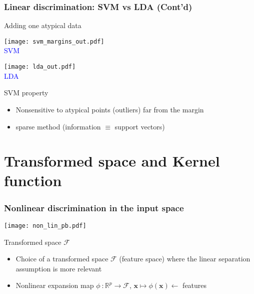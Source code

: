 \documentclass[compress, smaller, serif, 9pt]{beamer}
\newcommand{\structuretext}[1]{{\usebeamercolor[fg]{structure} #1}}
\newcommand{\doigt}{\structuretext{\noindent \Pisymbol{pzd}{43}}}
\newcommand{\bx}{{\boldsymbol{x}}}
\begin{document}
\begin{frame}
  \frametitle{Linear discrimination:  SVM vs LDA (Cont'd)}

\begin{block}{Adding one atypical data}
\end{block}


\begin{minipage}{.48\textwidth}
\begin{center}
\texttt{[image: svm\_margins\_out.pdf]}\\
\textcolor{blue}{SVM}
\end{center}
\end{minipage}
\hfill
\begin{minipage}{.48\textwidth}
\begin{center}
\texttt{[image: lda\_out.pdf]}\\
\textcolor{blue}{LDA}
\end{center}
\end{minipage}

  \begin{block}{SVM property}
   \begin{itemize}
    \item Nonsensitive to atypical points (outliers) far from the margin
    \item[\doigt] sparse method (information $\equiv$ support vectors)
   \end{itemize}
  \end{block}

\end{frame}




\section{Transformed space and Kernel function}




\begin{frame}
  \frametitle{Nonlinear discrimination in the input space}


\begin{center}
\texttt{[image: non\_lin\_pb.pdf]}
\end{center}

\begin{block}{Transformed space $\mathcal{F}$}
\begin{itemize}
   \item Choice of a transformed space  $\mathcal{F}$ (feature space) where
   the linear separation assumption is more relevant
   \item Nonlinear expansion map $\phi~: \mathbb{R}^p \rightarrow \mathcal{F} $, $\bx\mapsto \phi(\bx)\leftarrow$ features
\end{itemize}


\end{block}


\end{frame}
\end{document}
